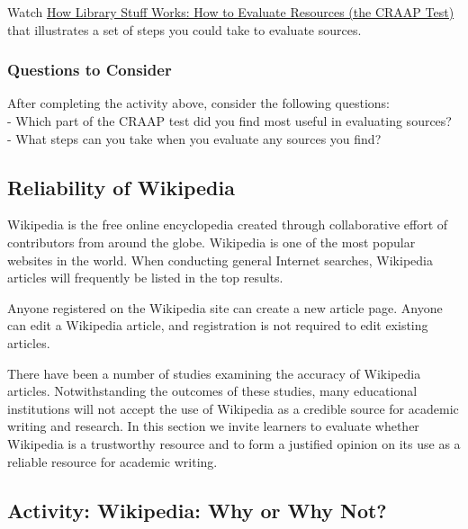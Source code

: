 \documentclass[
]{book}
\theoremstyle{definition}
\theoremstyle{definition}
\theoremstyle{definition}
\theoremstyle{definition}
\theoremstyle{remark}
\begin{document}
\begin{reflect}
Watch \href{https://www.youtube.com/watch?v=_M1-aMCJHFg}{How Library Stuff Works: How to Evaluate Resources (the CRAAP Test)} that illustrates a set of steps you could take to evaluate sources.

\hypertarget{questions-to-consider}{%
\subsubsection*{Questions to Consider}\label{questions-to-consider}}

After completing the activity above, consider the following questions:\\
- Which part of the CRAAP test did you find most useful in evaluating sources?\\
- What steps can you take when you evaluate any sources you find?
\end{reflect}

\hypertarget{reliability-of-wikipedia}{%
\subsection*{Reliability of Wikipedia}\label{reliability-of-wikipedia}}

Wikipedia is the free online encyclopedia created through collaborative effort of contributors from around the globe. Wikipedia is one of the most popular websites in the world. When conducting general Internet searches, Wikipedia articles will frequently be listed in the top results.

Anyone registered on the Wikipedia site can create a new article page. Anyone can edit a Wikipedia article, and registration is not required to edit existing articles.

There have been a number of studies examining the accuracy of Wikipedia articles. Notwithstanding the outcomes of these studies, many educational institutions will not accept the use of Wikipedia as a credible source for academic writing and research. In this section we invite learners to evaluate whether Wikipedia is a trustworthy resource and to form a justified opinion on its use as a reliable resource for academic writing.

\hypertarget{activity-wikipedia-why-or-why-not}{%
\subsection*{Activity: Wikipedia: Why or Why Not?}\label{activity-wikipedia-why-or-why-not}}
\end{document}
